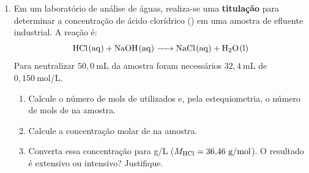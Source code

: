 \documentclass[10pt,a4paper,ssfamily]{exam}
\newcommand{\qini}{\begin{enumerate}[resume]\item}
\newcommand{\qend}{\end{enumerate}}
\begin{document}
\qini
Em um laboratório de análise de águas, realiza-se uma \textbf{titulação}
para determinar a concentração de ácido clorídrico () em uma
amostra de efluente industrial. A reação é:
\[
  \ce{HCl(aq) + NaOH(aq) -> NaCl(aq) + H2O(l)}
\]
Para neutralizar $50{,}0~\text{mL}$ da amostra foram necessários
$32{,}4~\text{mL}$ de  $0{,}150~\text{mol/L}$.
\begin{enumerate}
  \item Calcule o número de mols de  utilizados e, pela
        estequiometria, o número de mols de  na amostra.
  \item Calcule a concentração molar de  na amostra.
  \item Converta essa concentração para g/L
        ($M_{\ce{HCl}} = 36{,}46~\text{g/mol}$).
        O resultado é extensivo ou intensivo? Justifique.
\end{enumerate}

\vspace{2cm}
\qend
\end{document}
